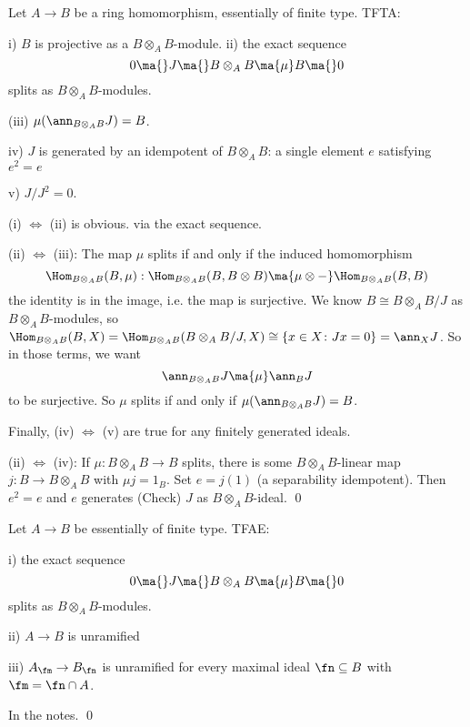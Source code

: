 \begin{lem}
Let $A \to B$ be a ring homomorphism, essentially of finite type. TFTA:

i) $B$ is projective as a $B \otimes_A B$-module.
ii) the exact sequence
	\[
	0 \ma{} J \ma{} B \otimes_A B \ma{\mu} B \ma{} 0
	\]
splits as $B \otimes_A B$-modules. 

(iii) $\mu(\ann_{B \otimes_A B} J)= B$. 

iv) $J$ is generated by an idempotent of $B \otimes_A B$: a single element $e$ satisfying $e^2=e$

v) $J/J^2=0$.  
\end{lem}

\pf (i) $\iff$ (ii) is obvious. via the exact sequence. 

(ii) $\iff$ (iii): The map $\mu$ splits if and only if the induced homomorphism 
	\[
	\Hom_{B \otimes_A B}(B,\mu): \Hom_{B \otimes_A B} (B, B \otimes B) \ma{\mu \otimes -} \Hom_{B \otimes_A B}(B,B)
	\]
the identity is in the image, i.e. the map is surjective. We know $B \cong B \otimes_A B/J$ as $B \otimes_A B$-modules, so $\Hom_{B \otimes_A B}(B,X)= \Hom_{B \otimes_A B}(B \otimes_A B/J,X) \cong \{ x \in X \colon Jx=0 \} = \ann_X J$. So in those terms, we want
	\[
	\ann_{B \otimes_A B} J \ma{\mu} \ann_B J
	\]
to be surjective. So $\mu$ splits if and only if $\mu(\ann_{B \otimes_A B} J)= B$. 

Finally, (iv) $\iff$ (v) are true for any finitely generated ideals. 

(ii)  $\iff$ (iv): If $\mu: B \otimes_A B \to B$ splits, there is some $B \otimes_A B$-linear map $j: B \to B \otimes_A B$ with $\mu j= 1_B$. Set $e=j(1)$ (a separability idempotent). Then $e^2=e$ and $e$ generates (Check) $J$ as $B \otimes_A B$-ideal. \qed \\


\begin{prop}
Let $A \to B$ be essentially of finite type. TFAE:

i) the exact sequence 
	\[
	0 \ma{} J \ma{} B \otimes_A B \ma{\mu} B \ma{} 0
	\]
splits as $B \otimes_A B$-modules. 

ii) $A \to B$ is unramified

iii) $A_\fm \to B_\fn$ is unramified for every maximal ideal $\fn \subseteq B$ with $\fm= \fn \cap A$. 
\end{prop}

\pf In the notes. \qed \\





















